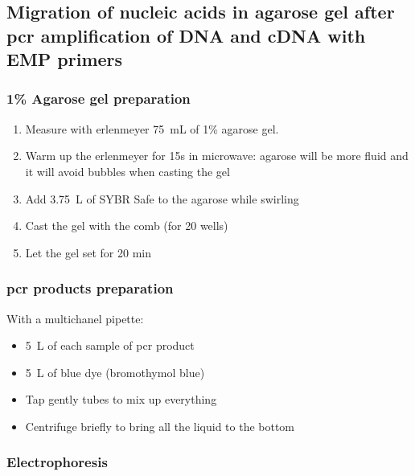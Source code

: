 \subsection{Migration of nucleic acids in agarose gel after \gls{pcr} amplification of DNA and cDNA with EMP primers}
\label{task:20180217_cj2}

\subsubsection{1\% Agarose gel preparation}

\begin{enumerate}
\item Measure with erlenmeyer 75~mL of 1\% agarose gel.
\item Warm up the erlenmeyer for 15s in microwave: agarose will be more fluid and it will avoid bubbles when casting the gel
\item Add 3.75~\textmu L of SYBR Safe to the agarose while swirling 
\item Cast the gel with the comb (for 20 wells)
\item Let the gel set for 20 min
\end{enumerate}

\subsubsection{\gls{pcr} products preparation}

With a multichanel pipette:
\begin{itemize}
\item 5~\textmu L of each sample of \gls{pcr} product
\item 5~\textmu L of blue dye (bromothymol blue)
\item Tap gently tubes to mix up everything
\item Centrifuge briefly to bring all the liquid to the bottom
\end{itemize}

\subsubsection{Electrophoresis}

